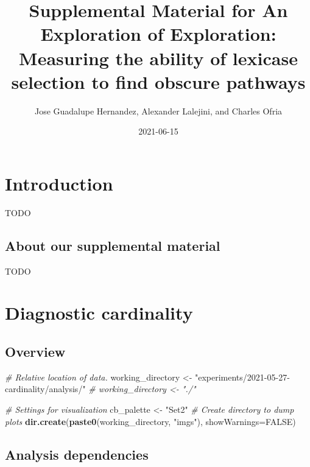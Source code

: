 \documentclass[]{book}
\title{Supplemental Material for An Exploration of Exploration: Measuring the ability of lexicase selection to find obscure pathways}
\author{Jose Guadalupe Hernandez, Alexander Lalejini, and Charles Ofria}
\date{2021-06-15}
\newenvironment{Shaded}{\begin{snugshade}}{\end{snugshade}}
\newcommand{\CommentTok}[1]{\textcolor[rgb]{0.56,0.35,0.01}{\textit{#1}}}
\newcommand{\DataTypeTok}[1]{\textcolor[rgb]{0.13,0.29,0.53}{#1}}
\newcommand{\KeywordTok}[1]{\textcolor[rgb]{0.13,0.29,0.53}{\textbf{#1}}}
\newcommand{\NormalTok}[1]{#1}
\newcommand{\OtherTok}[1]{\textcolor[rgb]{0.56,0.35,0.01}{#1}}
\newcommand{\StringTok}[1]{\textcolor[rgb]{0.31,0.60,0.02}{#1}}
\begin{document}
\maketitle

{
\setcounter{tocdepth}{1}
\tableofcontents
}
\hypertarget{introduction}{%
\chapter{Introduction}\label{introduction}}

TODO

\hypertarget{about-our-supplemental-material}{%
\section{About our supplemental material}\label{about-our-supplemental-material}}

TODO

\hypertarget{diagnostic-cardinality}{%
\chapter{Diagnostic cardinality}\label{diagnostic-cardinality}}

\hypertarget{overview}{%
\section{Overview}\label{overview}}

\begin{Shaded}
\begin{Highlighting}[]
\CommentTok{# Relative location of data.}
\NormalTok{working_directory <-}
\StringTok{  "experiments/2021-05-27-cardinality/analysis/"}
\CommentTok{# working_directory <- "./"}

\CommentTok{# Settings for visualization}
\NormalTok{cb_palette <-}\StringTok{ "Set2"}
\CommentTok{# Create directory to dump plots}
\KeywordTok{dir.create}\NormalTok{(}\KeywordTok{paste0}\NormalTok{(working_directory, }\StringTok{"imgs"}\NormalTok{), }\DataTypeTok{showWarnings=}\OtherTok{FALSE}\NormalTok{)}
\end{Highlighting}
\end{Shaded}

\hypertarget{analysis-dependencies}{%
\section{Analysis dependencies}\label{analysis-dependencies}}
\end{document}
